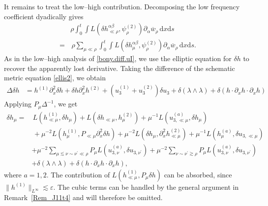 \documentclass[11pt,letterpaper,reqno]{amsart}
\numberwithin{equation}{section}
\theoremstyle{definition}
\theoremstyle{remark}
\begin{document}
 
It remains to treat the low--high contribution.  Decomposing the low frequency coefficient dyadically gives
\begin{align}
    &\rho 
\int_0^t\int
L
(\delta h_{\ll\rho}^{\alpha\beta}, \psi_\rho^{(2)})
\partial_\alpha\overline{w}_\rho\,\mathrm{d} x \mathrm{d} s \nonumber\\
   = &\,  \rho \sum_{\mu \ll \rho}
\int_0^t\int
L
(\delta h_{\mu}^{\alpha\beta}, \psi_\rho^{(2)})
\partial_\alpha\overline{w}_\rho\,\mathrm{d} x \mathrm{d} s.  \label{UA1.term2.t1}
\end{align}
As in the low--high analysis of \eqref{bony.diff.uI}, we use the elliptic
equation for \(\delta h\) to recover the apparently lost derivative.
Taking the difference of the schematic metric equation \eqref{ellis2}, we
obtain
\[
\begin{aligned}
\Delta\delta h
&=
h^{(1)}\partial_x^2\delta h
+
\delta h \partial_x^2h^{(2)}
+
(u_3^{(1)}+u_3^{(2)})\delta u_3
+
\delta  (\lambda\wedge\lambda )
 + \delta ( h\cdot\partial_x h\cdot \partial_x h)
\end{aligned}
\]
Applying \(P_\mu\Delta^{-1}\), we get
\begin{align}
   \delta h_\mu
=&\,
L(h^{(1)}_{\ll\mu},\delta h_\mu)
+L(\delta h_{\ll \mu},  h^{(2)}_{\mu})+\mu^{-1} L( u_{3,\ll \mu}^{(a)}, \delta h_{\mu} ) \label{Pmuh}
\\
&\,+\mu^{-2}L(h^{(1)}_{\mu},P_{\ll\mu}\partial_x^2 \delta h)
+\mu^{-2} L(\delta h_{  \mu},  \partial_x^2 h^{(2)}_{\ll\mu}) +\mu^{-1} L( h_{ \mu}^{(a)}, \delta u_{3,\ll\mu} )\nonumber\\
&+\mu^{-2}\sum_{\mu\lesssim \nu\sim \nu^\prime \ll \rho} P_\mu L(u^{(a)}_{3,\nu}, \delta u_{3,\nu^\prime}) +
\mu^{-2}\sum_{\nu\sim \nu^\prime \gtrsim \rho} P_\mu L(u^{(a)}_{3,\nu}, \delta u_{3,\nu^\prime})\nonumber\\
&+ 
\delta  (\lambda\wedge\lambda )
+
 \delta ( h\cdot\partial_x h\cdot \partial_x h), \nonumber
\end{align}
where \(a=1,2\).
The contribution of \(L(h^{(1)}_{\ll\mu},P_\mu\delta h)\) can be absorbed, since
\(
\|h^{(1)}\|_{L^\infty}\lesssim \varepsilon. 
\) 
The cubic terms can be handled by the general argument in Remark~\ref{Rem_J11t4} and will therefore be omitted.
\end{document}
